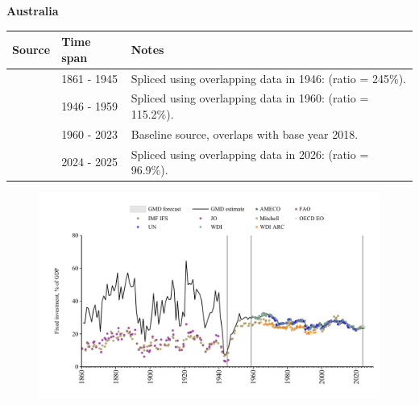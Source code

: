 \documentclass[12pt,a4paper,landscape]{article}
\begin{document}
\begin{adjustbox}{max totalsize={\paperwidth}{\paperheight},center}
\begin{minipage}[t][\textheight][t]{\textwidth}
\vspace*{0.5cm}
{}
\begin{center}
{\Large\bfseries Australia}
\end{center}
\vspace{0.5cm}
\begin{table}[H]
\centering
\small
\begin{tabular}{|l|l|l|}
\hline
\textbf{Source} & \textbf{Time span} & \textbf{Notes} \\
\hline
\rowcolor{white}\cite{JO}& 1861 - 1945 &Spliced using overlapping data in 1946: (ratio = 245\%).\\
\rowcolor{lightgray}\cite{Mitchell}& 1946 - 1959 &Spliced using overlapping data in 1960: (ratio = 115.2\%).\\
\rowcolor{white}\cite{WDI}& 1960 - 2023 &Baseline source, overlaps with base year 2018.\\
\rowcolor{lightgray}\cite{OECD_EO}& 2024 - 2025 &Spliced using overlapping data in 2026: (ratio = 96.9\%).\\
\hline
\end{tabular}
\end{table}
\begin{figure}[H]
\centering
\includegraphics[width=\textwidth,height=0.6\textheight,keepaspectratio]{graphs/AUS_finv_GDP.pdf}
\end{figure}
\end{minipage}
\end{adjustbox}
\end{document}
